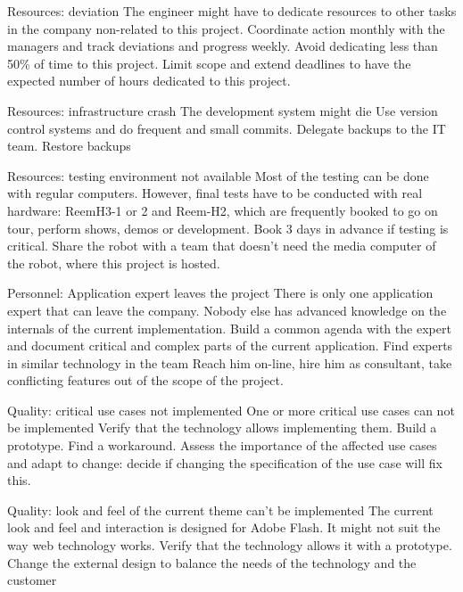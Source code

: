 \begin{risk}
{Resources: deviation}
{The engineer might have to dedicate resources to other tasks in the company non-related to this project.}
{Coordinate action monthly with the managers and track deviations and progress weekly. Avoid dedicating less than 50\% of time to this project.}
{Limit scope and extend deadlines to have the expected number of hours dedicated to this project.}
\end{risk}

\begin{risk}
{Resources: infrastructure crash}
{The development system might die}
{Use version control systems and do frequent and small commits. Delegate backups to the IT team.}
{Restore backups}
\end{risk}

\begin{risk}
{Resources: testing environment not available}
{Most of the testing can be done with regular computers. However, final tests have to be conducted with real hardware: ReemH3-1 or 2 and Reem-H2, which are frequently booked to go on tour, perform shows, demos or development.}
{Book 3 days in advance if testing is critical. }
{Share the robot with a team that doesn't need the media computer of the robot, where this project is hosted.}
\end{risk}

\begin{risk}
{Personnel: Application expert leaves the project}
{There is only one application expert that can leave the company. Nobody else has advanced knowledge on the internals of the current implementation.}
{Build a common agenda with the expert and document critical and complex parts of the current application. Find experts in similar technology in the team}
{Reach him on-line, hire him as consultant, take conflicting features out of the scope of the project.}
\end{risk}

\begin{risk}
{Quality: critical use cases not implemented}
{One or more critical use cases can not be implemented}
{Verify that the technology allows implementing them. Build a prototype. }
{Find a workaround. Assess the importance of the affected use cases and adapt to change: decide if changing the specification of the use case will fix this.}
\end{risk}

\begin{risk}
{Quality: look and feel of the current theme can't be implemented}
{The current look and feel and interaction is designed for Adobe Flash. It might not suit the way web technology works.}
{Verify that the technology allows it with a prototype.}
{Change the external design to balance the needs of the technology and the customer}
\end{risk}

